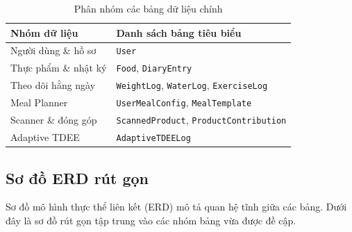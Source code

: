 \documentclass[12pt, a4paper]{report}
\begin{document}
\begin{table}[htbp]
\centering
\caption{Phân nhóm các bảng dữ liệu chính}
\label{tab:nhom_bang_du_lieu}
\begin{tabular}{|>{\raggedright\arraybackslash}p{4cm}|>{\raggedright\arraybackslash}p{10cm}|}
\hline
\textbf{Nhóm dữ liệu} & \textbf{Danh sách bảng tiêu biểu} \\
\hline
Người dùng \& hồ sơ & \texttt{User} \\
\hline
Thực phẩm \& nhật ký & \texttt{Food}, \texttt{DiaryEntry} \\
\hline
Theo dõi hằng ngày & \texttt{WeightLog}, \texttt{WaterLog}, \texttt{ExerciseLog} \\
\hline
Meal Planner & \texttt{UserMealConfig}, \texttt{MealTemplate} \\
\hline
Scanner \& đóng góp & \texttt{ScannedProduct}, \texttt{ProductContribution} \\
\hline
Adaptive TDEE & \texttt{AdaptiveTDEELog} \\
\hline
\end{tabular}
\end{table}

\subsection{Sơ đồ ERD rút gọn}
Sơ đồ mô hình thực thể liên kết (ERD) mô tả quan hệ tĩnh giữa các bảng. Dưới đây là sơ đồ rút gọn tập trung vào các nhóm bảng vừa được đề cập.
\end{document}
